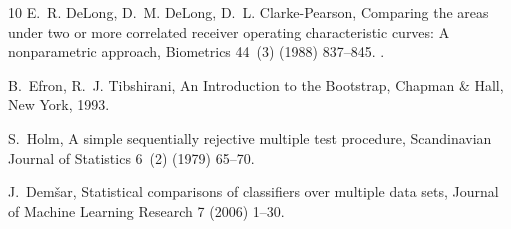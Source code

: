 \documentclass[final,5p,twocolumn]{elsarticle}
\begin{document}
\begin{thebibliography}{10}
E.~R. DeLong, D.~M. DeLong, D.~L. Clarke-Pearson, Comparing the areas under two
  or more correlated receiver operating characteristic curves: A nonparametric
  approach, Biometrics 44~(3) (1988) 837--845.
\newblock \href {https://doi.org/10.2307/2531595} {}.

B.~Efron, R.~J. Tibshirani, An Introduction to the Bootstrap, Chapman \& Hall,
  New York, 1993.

S.~Holm, A simple sequentially rejective multiple test procedure, Scandinavian
  Journal of Statistics 6~(2) (1979) 65--70.

J.~Dem{\v{s}}ar, Statistical comparisons of classifiers over multiple data
  sets, Journal of Machine Learning Research 7 (2006) 1--30.

\end{thebibliography}
\endgroup
\end{document}
